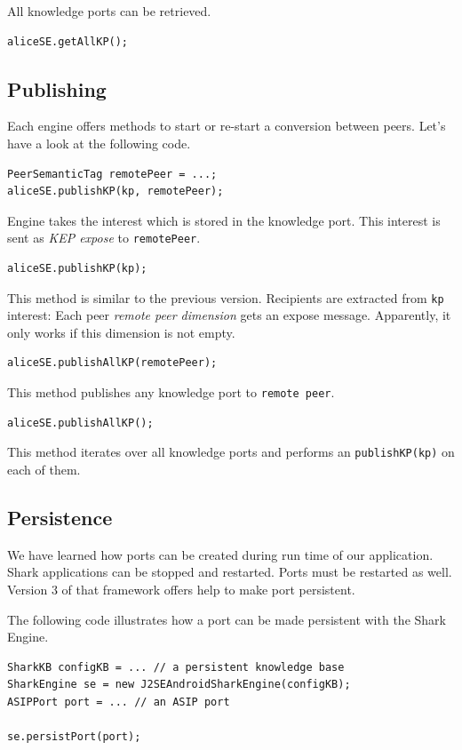 All knowledge ports can be retrieved.
\begin{verbatim}
aliceSE.getAllKP();
\end{verbatim}

\subsection{Publishing}
Each engine offers methods to start or re-start a conversion between peers.
Let's have a look at the following code.

\begin{verbatim}
PeerSemanticTag remotePeer = ...;
aliceSE.publishKP(kp, remotePeer);
\end{verbatim}

Engine takes the interest which is stored in the knowledge port. This interest is sent as {\it KEP expose} to {\tt remotePeer}.

\begin{verbatim}
aliceSE.publishKP(kp);
\end{verbatim}

This method is similar to the previous version. Recipients are extracted from {\tt kp} interest: Each peer {\it remote peer dimension} gets an expose message.
Apparently, it only works if this dimension is not empty.

\begin{verbatim}
aliceSE.publishAllKP(remotePeer);
\end{verbatim}

This method publishes any knowledge port to {\tt remote peer}.

\begin{verbatim}
aliceSE.publishAllKP();
\end{verbatim}

This method iterates over all knowledge ports and performs an {\tt publishKP(kp)} on each of them.

\subsection{Persistence}
We have learned how ports can be created during run time of our application. 
Shark applications can be stopped and restarted. Ports must be restarted as
well. Version 3 of that framework offers help to make port persistent.

The following code illustrates how a port can be made persistent with
the Shark Engine.

\begin{verbatim}
SharkKB configKB = ... // a persistent knowledge base
SharkEngine se = new J2SEAndroidSharkEngine(configKB);
ASIPPort port = ... // an ASIP port

se.persistPort(port);
\end{verbatim}

